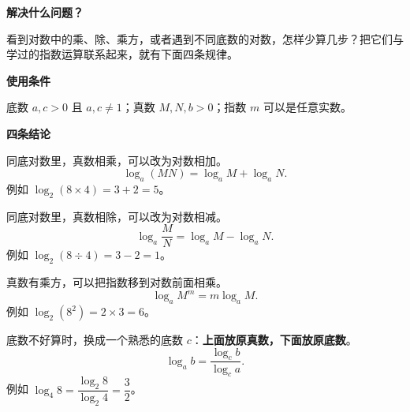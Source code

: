 \begin{statementbox}
	\textbf{\textcolor{CStatement}{解决什么问题？}}

	看到对数中的乘、除、乘方，或者遇到不同底数的对数，怎样少算几步？把它们与学过的指数运算联系起来，就有下面四条规律。

	\medskip
	\textbf{\textcolor{CStatement}{使用条件}}
	\begin{description}[style=nextline, leftmargin=2.8em, labelsep=0.5em, itemsep=0.35em]
		\item[\textbf{先检查：}] 底数 $a,c>0$ 且 $a,c\neq1$；真数 $M,N,b>0$；指数 $m$ 可以是任意实数。
	\end{description}

	\textbf{\textcolor{CStatement}{四条结论}}
	\begin{description}[style=nextline, leftmargin=2.8em, labelsep=0.5em, itemsep=0.45em]
		\item[\textbf{结论一（积变加）：}]
			同底对数里，真数相乘，可以改为对数相加。
			\[
				\log_a(MN)=\log_a M+\log_a N.
			\]
			例如 $\log_2(8\times4)=3+2=5$。

		\item[\textbf{结论二（商变减）：}]
			同底对数里，真数相除，可以改为对数相减。
			\[
				\log_a\frac{M}{N}=\log_a M-\log_a N.
			\]
			例如 $\log_2(8\div4)=3-2=1$。

		\item[\textbf{结论三（指数提前）：}]
			真数有乘方，可以把指数移到对数前面相乘。
			\[
				\log_a M^m=m\log_a M.
			\]
			例如 $\log_2(8^2)=2\times3=6$。

		\item[\textbf{结论四（换底公式）：}]
			底数不好算时，换成一个熟悉的底数 $c$：\textbf{上面放原真数，下面放原底数}。
			\[
				\log_a b=\frac{\log_c b}{\log_c a}.
			\]
			例如 $\log_4 8=\dfrac{\log_2 8}{\log_2 4}=\dfrac32$。
	\end{description}
\end{statementbox}

